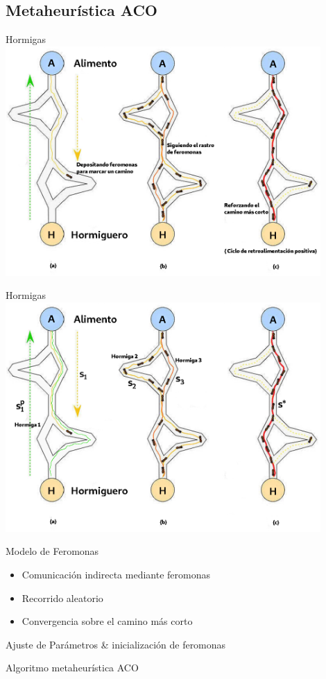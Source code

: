 \subsection{Metaheur\'istica ACO}
\begin{frame}{Hormigas}
\includegraphics[width=0.9\textwidth]{Pictures/ACO-ant.png}
\end{frame}

\begin{frame}{Hormigas}
\centering
\includegraphics[width=0.9\textwidth]{Pictures/ACO-ant-2.png}
\end{frame}

\begin{frame}{Modelo de Feromonas}
\begin{itemize}
    \item Comunicaci\'on indirecta mediante feromonas
    \item Recorrido aleatorio
    \item Convergencia sobre el camino m\'as corto
\end{itemize}
    \begin{algorithm}[H]
    \SetAlgoLined
     Ajuste de Par\'ametros \& inicializaci\'on de feromonas\;
     \caption{Algoritmo metaheur\'istica ACO}\label{ACO-Algo}
    \end{algorithm}
\end{frame}

